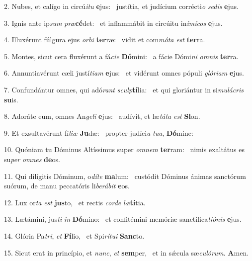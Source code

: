 2. Nubes, et calígo in circú\textit{i}\textit{tu} \textbf{e}jus: \ast\  justítia, et judícium corrécti\textit{o} \textit{se}\textit{dis} \textbf{e}jus.\

3. Ignis ante ip\textit{sum} \textit{præ}\textbf{cé}det: \ast\  et inflammábit in circúitu in\textit{i}\textit{mí}\textit{cos} \textbf{e}jus.\

4. Illuxérunt fúlgura ejus \textit{or}\textit{bi} \textbf{ter}ræ: \ast\  vidit et com\textit{mó}\textit{ta} \textit{est} \textbf{ter}ra.\

5. Montes, sicut cera fluxérunt a fá\textit{ci}\textit{e} \textbf{Dó}mini: \ast\  a fácie Dómi\textit{ni} \textit{om}\textit{nis} \textbf{ter}ra.\

6. Annuntiavérunt cæli justí\textit{ti}\textit{am} \textbf{e}jus: \ast\  et vidérunt omnes pópuli \textit{gló}\textit{ri}\textit{am} \textbf{e}jus.\

7. Confundántur omnes, qui adó\textit{rant} \textit{sculp}\textbf{tí}lia: \ast\  et qui gloriántur in si\textit{mu}\textit{lá}\textit{cris} \textbf{su}is.\

8. Adoráte eum, omnes An\textit{ge}\textit{li} \textbf{e}jus: \ast\  audívit, et læ\textit{tá}\textit{ta} \textit{est} \textbf{Si}on.\

9. Et exsultavérunt fí\textit{li}\textit{æ} \textbf{Ju}dæ: \ast\  propter judíci\textit{a} \textit{tu}\textit{a}, \textbf{Dó}mine:\

10. Quóniam tu Dóminus Altíssimus super \textit{om}\textit{nem} \textbf{ter}ram: \ast\  nimis exaltátus es su\textit{per} \textit{om}\textit{nes} \textbf{de}os.\

11. Qui dilígitis Dóminum, o\textit{dí}\textit{te} \textbf{ma}lum: \ast\  custódit Dóminus ánimas sanctórum suórum, de manu peccatóris li\textit{be}\textit{rá}\textit{bit} \textbf{e}os.\

12. Lux or\textit{ta} \textit{est} \textbf{jus}to, \ast\  et rectis \textit{cor}\textit{de} \textit{læ}\textbf{tí}tia.\

13. Lætámini, jus\textit{ti} \textit{in} \textbf{Dó}mino: \ast\  et confitémini memóriæ sanctifica\textit{ti}\textit{ó}\textit{nis} \textbf{e}jus.\

14. Glória Pa\textit{tri}, \textit{et} \textbf{Fí}lio, \ast\  et Spi\textit{rí}\textit{tu}\textit{i} \textbf{Sanc}to.\

15. Sicut erat in princípio, et \textit{nunc}, \textit{et} \textbf{sem}per, \ast\  et in sǽcula sæ\textit{cu}\textit{ló}\textit{rum}. \textbf{A}men.\

